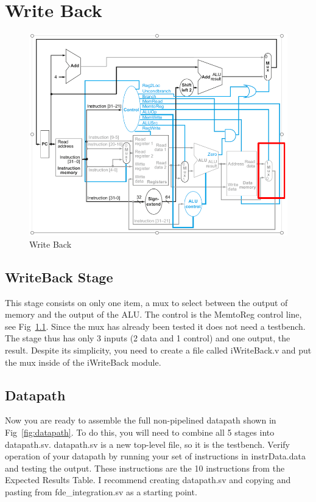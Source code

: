\chapter{Write Back}


\begin{figure}
\caption{Write Back}\label{fig:wb}
\begin{center}
\includegraphics[width=\textwidth]{../images/writeback_stage.png}
\end{center}
\end{figure}

\WrapBarrier

\section{WriteBack Stage}
This stage consists on only one item, a mux to select between the output of memory and the output of the ALU.  The control is the MemtoReg control line, see Fig~\ref{fig:wb}.  Since the mux has already been tested it does not need a testbench.  The stage thus has only 3 inputs (2 data and 1 control) and one output, the result.  Despite its simplicity, you need to create a file called iWriteBack.v and put the mux inside of the iWriteBack module.

\section{Datapath}
Now you are ready to assemble the full non-pipelined datapath shown in Fig~\ref{fig:datapath}.  To do this, you will need to combine all 5 stages into datapath.sv.  datapath.sv is a new top-level file, so it is the testbench.  Verify operation of your datapath by running your set of instructions in instrData.data and testing the output.  These instructions are the 10 instructions from the Expected Results Table.  I recommend creating datapath.sv and copying and pasting from fde\_integration.sv as a starting point.  

